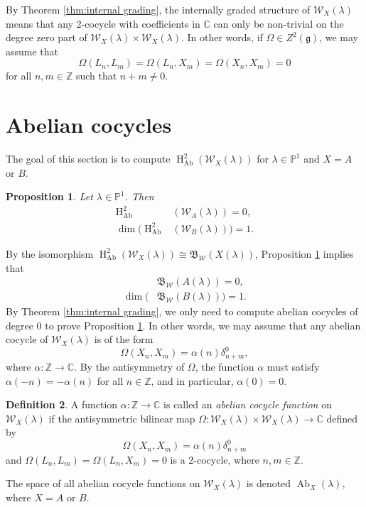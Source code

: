 \documentclass[11pt, svgnames]{amsart}
\newcommand{\g}{\ensuremath{\mathfrak{g}}}
\newcommand{\B}{\mathfrak{B}}
\newcommand{\ZZ}{\mathbb{Z}}
\newcommand{\CC}{\mathbb{C}}
\newcommand{\PP}{\mathbb{P}}
\newcommand{\W}{\mathcal{W}}
\DeclareMathOperator{\HH}{H}
\DeclareMathOperator{\Ab}{Ab}
\newtheorem{proposition}{Proposition}[section]
\theoremstyle{definition}
\newtheorem{defn}[proposition]{Definition}
\begin{document}
By Theorem \ref{thm:internal grading}, the internally graded structure of $\W_X(\lambda)$ means that any 2-cocycle with coefficients in $\CC$ can only be non-trivial on the degree zero part of $\W_X(\lambda) \times \W_X(\lambda)$. In other words, if $\Omega \in Z^2(\g)$, we may assume that
$$\Omega(L_n,L_m) = \Omega(L_n,X_m) = \Omega(X_n,X_m) = 0$$
for all $n,m \in \ZZ$ such that $n + m \neq 0$.

\section{Abelian cocycles}\label{sec:abelian cocycles}

The goal of this section is to compute $\HH_{\Ab}^2(\W_X(\lambda))$ for $\lambda \in \PP^1$ and $X = A$ or $B$.

\begin{proposition}\label{prop:W_X abelian cocycles}
    Let $\lambda \in \PP^1$. Then
    \begin{align*}
        \HH_{\Ab}^2&(\W_A(\lambda)) = 0, \\
        \dim(\HH_{\Ab}^2&(\W_B(\lambda))) = 1.
    \end{align*}
\end{proposition}

By the isomorphism $\HH^2_{\Ab}(\W_X(\lambda)) \cong \B_\W(X(\lambda))$, Proposition \ref{prop:W_X abelian cocycles} implies that
\begin{align*}
    &\B_\W(A(\lambda)) = 0, \\
    \dim(&\B_\W(B(\lambda))) = 1.
\end{align*}
By Theorem \ref{thm:internal grading}, we only need to compute abelian cocycles of degree 0 to prove Proposition \ref{prop:W_X abelian cocycles}. In other words, we may assume that any abelian cocycle of $\W_X(\lambda)$ is of the form
\begin{equation}
    \Omega (X_n, X_m) = \alpha(n) \delta_{n+m}^0,
\end{equation}
where $\alpha \colon \ZZ \to \CC$. By the antisymmetry of $\Omega$, the function $\alpha$ must satisfy $\alpha(-n) = - \alpha(n)$ for all $n \in \ZZ$, and in particular, $\alpha(0) = 0$.

\begin{defn}
    A function $\alpha \colon \ZZ \to \CC$ is called an \emph{abelian cocycle function} on $\W_X(\lambda)$ if the antisymmetric bilinear map $\Omega \colon \W_X(\lambda) \times \W_X(\lambda) \to \CC$ defined by
    $$\Omega(X_n,X_m) = \alpha(n)\delta_{n+m}^0$$
    and $\Omega(L_n,L_m) = \Omega(L_n,X_m) = 0$ is a 2-cocycle, where $n,m \in \ZZ$.
    
    The space of all abelian cocycle functions on $\W_X(\lambda)$ is denoted $\Ab_X(\lambda)$, where $X = A$ or $B$.
\end{defn}
\end{document}

